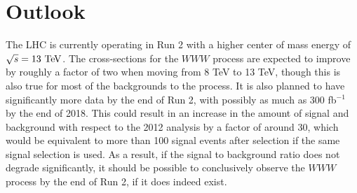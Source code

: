 \section{Outlook}
The LHC is currently operating in Run 2 with a higher center of mass energy
of $\sqrt{s} = 13 \TeV$. The cross-sections for the $WWW$ process
are expected to improve by roughly a factor of two when moving from 8 TeV
to 13 TeV, though this is also true for most of 
the backgrounds to the process.  It is also planned to have significantly
more data by the end of Run 2, with possibly as much as 300 fb$^{-1}$ by 
the end of 2018.  This could result in an increase in the amount
of signal and background with respect to the 2012 analysis
by a factor of around 30, which would be equivalent to more than 100 signal
events after selection if the 
same signal selection is used. As a result, 
if the signal to background ratio
does not degrade significantly, it should 
be possible to  conclusively observe the $WWW$ process by the end of Run 2,
if it does indeed exist. 

